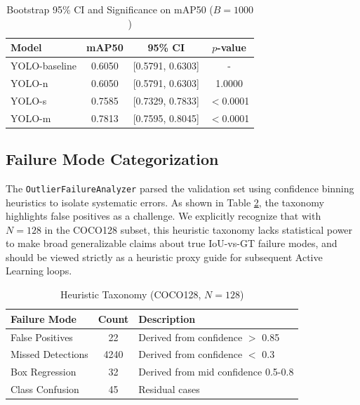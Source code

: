 \documentclass[conference]{IEEEtran}
\begin{document}
\begin{table}[htbp]
\caption{Bootstrap 95\% CI and Significance on mAP50 ($B=1000$)}
\begin{center}
\begin{tabular}{lccc}
\toprule
\textbf{Model} & \textbf{mAP50} & \textbf{95\% CI} & \textbf{$p$-value} \\
\midrule
YOLO-baseline & 0.6050 & [0.5791, 0.6303] & - \\
YOLO-n & 0.6050 & [0.5791, 0.6303] & 1.0000 \\
YOLO-s & 0.7585 & [0.7329, 0.7833] & $<$0.0001 \\
YOLO-m & 0.7813 & [0.7595, 0.8045] & $<$0.0001 \\
\bottomrule
\end{tabular}
\label{tab:bootstrap}
\end{center}
\end{table}

\subsection{Failure Mode Categorization}
The \texttt{OutlierFailureAnalyzer} parsed the validation set using confidence binning heuristics to isolate systematic errors. As shown in Table \ref{tab:failure}, the taxonomy highlights false positives as a challenge. We explicitly recognize that with $N=128$ in the COCO128 subset, this heuristic taxonomy lacks statistical power to make broad generalizable claims about true IoU-vs-GT failure modes, and should be viewed strictly as a heuristic proxy guide for subsequent Active Learning loops.

\begin{table}[htbp]
\caption{Heuristic Taxonomy (COCO128, $N=128$)}
\begin{center}
\begin{tabular}{lcl}
\toprule
\textbf{Failure Mode} & \textbf{Count} & \textbf{Description} \\
\midrule
False Positives & 22 & Derived from confidence $>$ 0.85 \\
Missed Detections & 4240 & Derived from confidence $<$ 0.3 \\
Box Regression & 32 & Derived from mid confidence 0.5-0.8 \\
Class Confusion & 45 & Residual cases \\
\bottomrule
\end{tabular}
\label{tab:failure}
\end{center}
\end{table}
\end{document}
